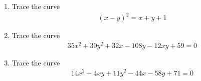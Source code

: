 \renewcommand{\theequation}{\theenumi}
\renewcommand{\thefigure}{\theenumi}
\begin{enumerate}[label=\thesubsection.\arabic*.,ref=\thesubsection.\theenumi]
%
\item 	Trace the curve 
	\begin{align}
	\left(x-y\right)^2 = x+y+1
	\label{eq:solutions/41/2/eq0}
	\end{align}
%
\solution

%
\item Trace the curve
\begin{align}
35x^2+30y^2+32x-108y-12xy+59=0 \label{eq:solutions/41/ex/given_curve_eq}
\end{align}
%
\solution

\item Trace the curve
\begin{align}
14x^2 - 4xy + 11y^2 - 44x - 58y + 71 =0  \label{eq:solutions/41/ex1/given_curve_eq}
\end{align}

\solution


\end{enumerate}
